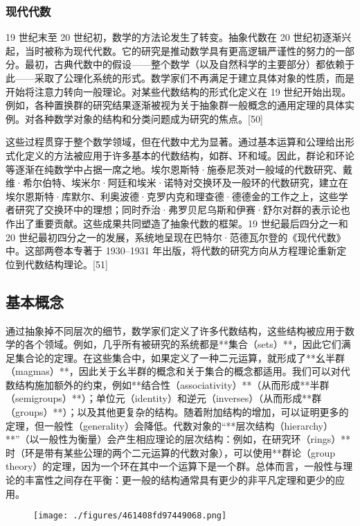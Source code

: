 \subsubsection{现代代数}
19 世纪末至 20 世纪初，数学的方法论发生了转变。抽象代数在 20 世纪初逐渐兴起，当时被称为现代代数。它的研究是推动数学具有更高逻辑严谨性的努力的一部分。最初，古典代数中的假设——整个数学（以及自然科学的主要部分）都依赖于此——采取了公理化系统的形式。数学家们不再满足于建立具体对象的性质，而是开始将注意力转向一般理论。对某些代数结构的形式化定义在 19 世纪开始出现。例如，各种置换群的研究结果逐渐被视为关于抽象群一般概念的通用定理的具体实例。对各种数学对象的结构和分类问题成为研究的焦点。[50]

这些过程贯穿于整个数学领域，但在代数中尤为显著。通过基本运算和公理给出形式化定义的方法被应用于许多基本的代数结构，如群、环和域。因此，群论和环论等逐渐在纯数学中占据一席之地。埃尔恩斯特·施泰尼茨对一般域的代数研究、戴维·希尔伯特、埃米尔·阿廷和埃米·诺特对交换环及一般环的代数研究，建立在埃尔恩斯特·库默尔、利奥波德·克罗内克和理查德·德德金的工作之上，这些学者研究了交换环中的理想；同时乔治·弗罗贝尼乌斯和伊赛·舒尔对群的表示论也作出了重要贡献。这些成果共同塑造了抽象代数的框架。19 世纪最后四分之一和 20 世纪最初四分之一的发展，系统地呈现在巴特尔·范德瓦尔登的《现代代数》中。这部两卷本专著于 1930–1931 年出版，将代数的研究方向从方程理论重新定位到代数结构理论。[51]
\subsection{基本概念}
通过抽象掉不同层次的细节，数学家们定义了许多代数结构，这些结构被应用于数学的各个领域。例如，几乎所有被研究的系统都是**集合（sets）**，因此它们满足集合论的定理。在这些集合中，如果定义了一种二元运算，就形成了**幺半群（magmas）**，因此关于幺半群的概念和关于集合的概念都适用。我们可以对代数结构施加额外的约束，例如**结合性（associativity）**（从而形成**半群（semigroups）**）；单位元（identity）和逆元（inverses）（从而形成**群（groups）**）；以及其他更复杂的结构。随着附加结构的增加，可以证明更多的定理，但一般性（generality）会降低。代数对象的“**层次结构（hierarchy）**”（以一般性为衡量）会产生相应理论的层次结构：例如，在研究\*\*环（rings）**时（环是带有某些公理的两个二元运算的代数对象），可以使用**群论（group theory）\*\*的定理，因为一个环在其中一个运算下是一个群。总体而言，一般性与理论的丰富性之间存在平衡：更一般的结构通常具有更少的非平凡定理和更少的应用。
\begin{figure}[ht]
\centering
\texttt{[image: ./figures/461408fd97449068.png]}
\caption{} \label{fig_CXds_2}
\end{figure}